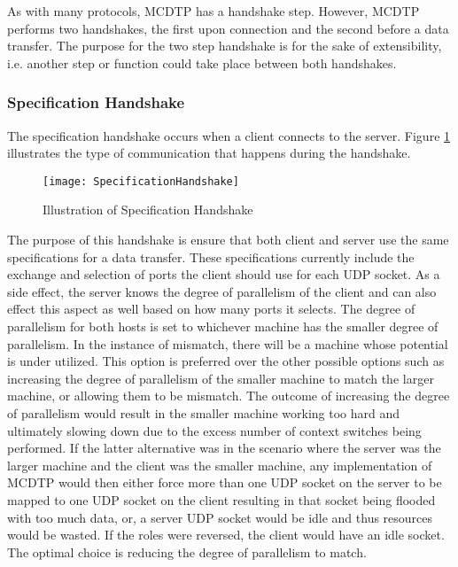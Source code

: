 As with many protocols, MCDTP has a handshake step. However, MCDTP performs two handshakes, the first upon connection and the second before a data transfer. The purpose for the two step handshake is for the sake of extensibility, i.e. another step or function could take place between both handshakes.

\subsubsection{Specification Handshake}

The specification handshake occurs when a client connects to the server. Figure \ref{fig:specs} illustrates the type of communication that happens during the handshake.

\begin{figure}[ht]
\centering
\texttt{[image: SpecificationHandshake]}
\caption{Illustration of Specification Handshake}
\label{fig:specs}
\end{figure}

The purpose of this handshake is ensure that both client and server use the same specifications for a data transfer. These specifications currently include the exchange and selection of ports the client should use for each UDP socket. As a side effect, the server knows the degree of parallelism of the client and can also effect this aspect as well based on how many ports it selects. The degree of parallelism for both hosts is set to whichever machine has the smaller degree of parallelism. In the instance of mismatch, there will be a machine whose potential is under utilized. This option is preferred over the other possible options such as increasing the degree of parallelism of the smaller machine to match the larger machine, or allowing them to be mismatch. The outcome of increasing the degree of parallelism would result in the smaller machine working too hard and ultimately slowing down due to the excess number of context switches being performed. If the latter alternative was in the scenario where the server was the larger machine and the client was the smaller machine, any implementation of MCDTP would then either force more than one UDP socket on the server to be mapped to one UDP socket on the client resulting in that socket being flooded with too much data, or, a server UDP socket would be idle and thus resources would be wasted. If the roles were reversed, the client would have an idle socket. The optimal choice is reducing the degree of parallelism to match.

